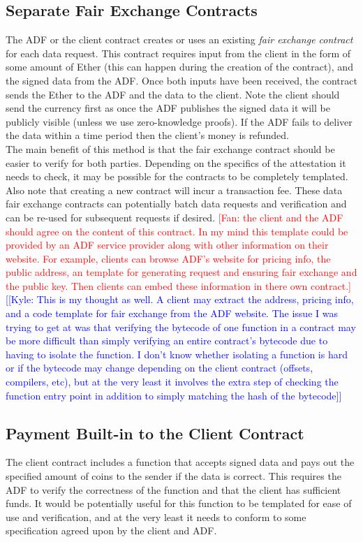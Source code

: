 \documentclass[letterpaper,twocolumn,10pt]{article}
\newcommand{\kyle}[1]{\textcolor{blue}{[[\textsf{Kyle:  #1}]]}}
\newcommand{\fan}[1]{\textcolor{red}{[\textsf{Fan:  #1}]}}
\begin{document}
\subsection{Separate Fair Exchange Contracts}
    The ADF or the client contract creates or uses an existing \emph{fair exchange contract} for each data request.  This contract requires input from the client in the form of some amount of Ether (this can happen during the creation of the contract), and the signed data from the ADF.  Once both inputs have been received, the contract sends the Ether to the ADF and the data to the client. Note the client should send the currency first as once the ADF publishes the signed data it will be publicly visible (unless we use zero-knowledge proofs). If the ADF fails to deliver the data within a time period then the client's money is refunded.\\
    \indent The main benefit of this method is that the fair exchange contract should be easier to verify for both parties.  Depending on the specifics of the attestation it needs to check, it may be possible for the contracts to be completely templated.  Also note that creating a new contract will incur a transaction fee.  These data fair exchange contracts can potentially batch data requests and verification and can be re-used for subsequent requests if desired. \fan{the client and the ADF should agree on the content of this contract. In my mind this template could be provided by an ADF service provider along with other information on their website. For example, clients can browse ADF's website for pricing info, the public address, an template for generating request and ensuring fair exchange and the public key. Then clients can embed these information in there own contract.}\\
    \kyle{This is my thought as well.  A client may extract the address, pricing info, and a code template for fair exchange from the ADF website.  The issue I was trying to get at was that verifying the bytecode of one function in a contract may be more difficult than simply verifying an entire contract's bytecode due to having to isolate the function.  I don't know whether isolating a function is hard or if the bytecode may change depending on the client contract (offsets, compilers, etc), but at the very least it involves the extra step of checking the function entry point in addition to simply matching the hash of the bytecode}
    
\subsection{Payment Built-in to the Client Contract}
    The client contract includes a function that accepts signed data and pays out the specified amount of coins to the sender if the data is correct.  This requires the ADF to verify the correctness of the function and that the client has sufficient funds.  It would be potentially useful for this function to be templated for ease of use and verification, and at the very least it needs to conform to some specification agreed upon by the client and ADF. 
    
\end{document}
